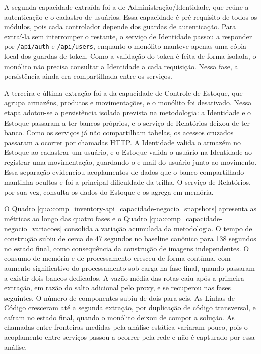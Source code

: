 A segunda capacidade extraída foi a de Administração/Identidade, que reúne a autenticação e o cadastro de usuários. Essa capacidade é pré-requisito de todos os módulos, pois cada controlador depende dos guardas de autenticação. Para extraí-la sem interromper o restante, o serviço de Identidade passou a responder por \texttt{/api/auth} e \texttt{/api/users}, enquanto o monólito manteve apenas uma cópia local dos guardas de token. Como a validação do token é feita de forma isolada, o monólito não precisa consultar a Identidade a cada requisição. Nessa fase, a persistência ainda era compartilhada entre os serviços.

A terceira e última extração foi a da capacidade de Controle de Estoque, que agrupa armazéns, produtos e movimentações, e o monólito foi desativado. Nessa etapa adotou-se a persistência isolada prevista na metodologia: a Identidade e o Estoque passaram a ter bancos próprios, e o serviço de Relatórios deixou de ter banco. Como os serviços já não compartilham tabelas, os acessos cruzados passaram a ocorrer por chamadas HTTP. A Identidade valida o armazém no Estoque ao cadastrar um usuário, e o Estoque valida o usuário na Identidade ao registrar uma movimentação, guardando o e-mail do usuário junto ao movimento. Essa separação evidenciou acoplamentos de dados que o banco compartilhado mantinha ocultos e foi a principal dificuldade da trilha. O serviço de Relatórios, por sua vez, consulta os dados do Estoque e os agrega em memória.

O Quadro \ref{qua:comp_inventory-api_capacidade-negocio_snapshots} apresenta as métricas ao longo das quatro fases e o Quadro \ref{qua:comp_capacidade-negocio_variacoes} consolida a variação acumulada da metodologia. O tempo de construção subiu de cerca de 47 segundos no baseline canônico para 138 segundos no estado final, como consequência da construção de imagens independentes. O consumo de memória e de processamento cresceu de forma contínua, com aumento significativo do processamento sob carga na fase final, quando passaram a existir dois bancos dedicados. A vazão média das rotas caiu após a primeira extração, em razão do salto adicional pelo proxy, e se recuperou nas fases seguintes. O número de componentes subiu de dois para seis. As Linhas de Código cresceram até a segunda extração, por duplicação de código transversal, e caíram no estado final, quando o monólito deixou de compor a solução. As chamadas entre fronteiras medidas pela análise estática variaram pouco, pois o acoplamento entre serviços passou a ocorrer pela rede e não é capturado por essa análise.


